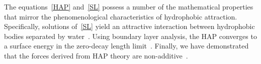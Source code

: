 The equations~\eqref{HAP} and~\eqref{SL} possess a number of the mathematical properties
that mirror the phenomenological characteristics of hydrophobic attraction.
Specifically, solutions of~\eqref{SL} yield an attractive interaction between
hydrophobic bodies separated by water~\cite{Eriksson1989}.
Using boundary layer analysis, the HAP converges to a surface energy in the zero-decay length
limit~\cite{Lee2018, Lin2015, Shibata2004}.
Finally, we have demonstrated that the forces derived from HAP theory are non-additive~\cite{Meyer2006, Fu2018_SIAM}. 

%
%
%
